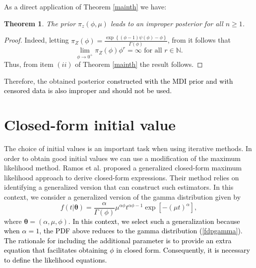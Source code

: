 \documentclass[]{interact}
\newcommand{\bs}{\boldsymbol}
\theoremstyle{plain}%
\newtheorem{theorem}{Theorem}[section]
\theoremstyle{definition}
\theoremstyle{remark}
\begin{document}
As a direct application of Theorem \ref{mainth} we have:
\begin{theorem} The prior $\pi_z(\phi,\mu)$ leads to an improper posterior for all $n\geq 1$.
\end{theorem}
\begin{proof} Indeed,  letting $\pi_Z(\phi) = \frac{\exp\left\{(\phi-1)\psi(\phi)-\phi\right\}}{\Gamma(\phi)}$, from \cite{ramos2021posterior} it follows that 
\begin{equation*} \lim_{\phi\to 0^+}\pi_Z(\phi)\phi^r = \infty\mbox{ for all }r\in \mathbb{N}.
\end{equation*}
Thus, from item $(ii)$ of Theorem \ref{mainth} the result follows.
\end{proof}
Therefore, the obtained posterior \textcolor{black}{constructed with the MDI prior and with censored data is also improper and should not be used.}



\section{Closed-form initial value}

The choice of initial values is an important task when using iterative methods. In order to obtain good initial values we can use a modification of the maximum likelihood method. Ramos et al. \cite{ramos2021modified} proposed a generalized closed-form maximum likelihood approach to derive closed-form expressions. Their method relies on identifying a generalized version that can construct such estimators. In this context, we consider a generalized version of the gamma distribution given by
\begin{equation*} f(t| \bs{\theta}) = \frac{\alpha}{\Gamma(\phi)} \mu^{\alpha \phi}t^{\alpha\phi-1}\exp\left[-(\mu t)^\alpha\right],
\end{equation*}
where $\bs{\theta}=(\alpha,\mu,\phi)$. \textcolor{black}{In this context, we select such a generalization because when $\alpha=1$, the PDF above reduces to the gamma distribution (\ref{fdpgamma}). The rationale for including the additional parameter is to provide an extra equation that facilitates obtaining $\phi$ in closed form. Consequently, it is necessary to define the likelihood equations.}
\end{document}
